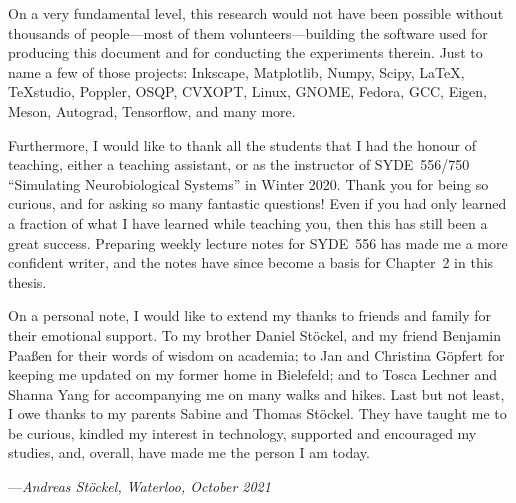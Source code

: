 On a very fundamental level, this research would not have been possible without thousands of people---most of them volunteers---building the software used for producing this document and for conducting the experiments therein. Just to name a few of those projects: Inkscape, Matplotlib, Numpy, Scipy, \LaTeX, \TeX studio, Poppler, OSQP, CVXOPT, Linux, GNOME, Fedora, GCC, Eigen, Meson, Autograd, Tensorflow, and many more.

Furthermore, I would like to thank all the students that I had the honour of teaching, either a teaching assistant, or as the instructor of SYDE~556/750 \enquote{Simulating Neurobiological Systems} in Winter 2020.
Thank you for being so curious, and for asking so many fantastic questions!
Even if you had only learned a fraction of what I have learned while teaching you, then this has still been a great success.
Preparing weekly lecture notes for SYDE~556 has made me a more confident writer, and the notes have since become a basis for Chapter~2 in this thesis.

On a personal note, I would like to extend my thanks to friends and family for their emotional support.
To my brother Daniel Stöckel, and my friend Benjamin Paaßen for their words of wisdom on academia; to Jan and Christina Göpfert for keeping me updated on my former home in Bielefeld; and to Tosca Lechner and Shanna Yang for accompanying me on many walks and hikes.
Last but not least, I owe thanks to my parents Sabine and Thomas Stöckel.
They have taught me to be curious, kindled my interest in technology, supported and encouraged my studies, and, overall, have made me the person I am today.

\bigskip

{
\raggedleft
---\emph{Andreas Stöckel, Waterloo, October 2021}\\
}
